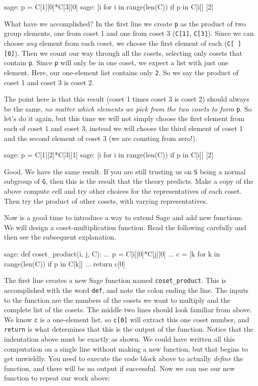 %
\begin{sageexample}
sage: p = C[1][0]*C[3][0]
sage: [i for i in range(len(C)) if p in C[i]]
[2]
\end{sageexample}
%
What have we accomplished?  In the first line we create \verb?p? as the product of two group elements, one from coset 1 and one from coset 3 (\verb?C[1]?, \verb?C[3]?).  Since we can choose \emph{any} element from each coset, we choose the first element of each (\verb?C[ ][0]?).  Then we count our way through all the cosets, selecting only cosets that contain \verb?p?.  Since \verb?p? will only be in one coset, we expect a list with just one element.  Here, our one-element list contains only \verb?2?.  So we say the product of coset 1 and coset 3 is coset 2.\par
%
The point here is that this result (coset 1 times coset 3 is coset 2) should always be the same, \emph{no matter which elements we pick from the two cosets to form} \verb?p?.  So let's do it again, but this time we will not simply choose the first element from each of coset 1 and coset 3, instead we will choose the third element of coset 1 and the second element of coset 3 (we are counting from zero!).
%
\begin{sageexample}
sage: p = C[1][2]*C[3][1]
sage: [i for i in range(len(C)) if p in C[i]]
[2]
\end{sageexample}
%
Good.  We have the same result.  If you are still trusting us on \verb?S? being a normal subgroup of \verb?G?, then this is the result that the theory predicts.  Make a copy of the above compute cell and try other choices for the representatives of each coset.  Then try the product of other cosets, with varying representatives.
%
\begin{sageverbatim}

\end{sageverbatim}
%
Now is a good time to introduce a way to extend Sage and add new functions.  We will design a coset-multiplication function.  Read the following carefully and then see the subsequent explanation.
%
\begin{sageexample}
sage: def coset_product(i, j, C):
...     p = C[i][0]*C[j][0]
...     c = [k for k in range(len(C)) if p in C[k]]
...     return c[0]
\end{sageexample}
%
The first line creates a new Sage function named \verb?coset_product?.  This is accomplished with the word \verb?def?, and note the colon ending the line.  The inputs to the function are the numbers of the cosets we want to multiply and the complete list of the cosets.  The middle two lines should look familiar from above.  We know \verb?c? is a one-element list, so \verb?c[0]? will extract this one coset number, and \verb?return? is what determines that this is the output of the function.  Notice that the indentation above must be exactly as shown.  We could have written all this computation on a single line without making a new function, but that begins to get unwieldly.  You need to execute the code block above to actually \emph{define} the function, and there will be no output if successful.  Now we can use our new function to repeat our work above:
